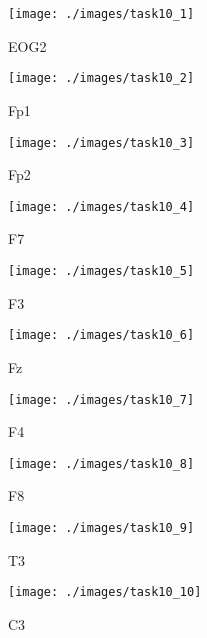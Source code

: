 \begin{figure}[!ht]
    \centering
    \texttt{[image: ./images/task10\_1]}
    \caption{EOG2}
    \label{fig:task10_eog2}
\end{figure}

\begin{figure}[!ht]
    \centering
    \texttt{[image: ./images/task10\_2]}
    \caption{Fp1}
    \label{fig:task10_fp1}
\end{figure}

\begin{figure}[!ht]
    \centering
    \texttt{[image: ./images/task10\_3]}
    \caption{Fp2}
    \label{fig:task10_fp2}
\end{figure}

\begin{figure}[!ht]
    \centering
    \texttt{[image: ./images/task10\_4]}
    \caption{F7}
    \label{fig:task10_f7}
\end{figure}

\begin{figure}[!ht]
    \centering
    \texttt{[image: ./images/task10\_5]}
    \caption{F3}
    \label{fig:task10_f3}
\end{figure}

\begin{figure}[!ht]
    \centering
    \texttt{[image: ./images/task10\_6]}
    \caption{Fz}
    \label{fig:task10_fz}
\end{figure}

\begin{figure}[!ht]
    \centering
    \texttt{[image: ./images/task10\_7]}
    \caption{F4}
    \label{fig:task10_f4}
\end{figure}

\begin{figure}[!ht]
    \centering
    \texttt{[image: ./images/task10\_8]}
    \caption{F8}
    \label{fig:task10_f8}
\end{figure}

\begin{figure}[!ht]
    \centering
    \texttt{[image: ./images/task10\_9]}
    \caption{T3}
    \label{fig:task10_t3}
\end{figure}

\begin{figure}[!ht]
    \centering
    \texttt{[image: ./images/task10\_10]}
    \caption{C3}
    \label{fig:task10_c3}
\end{figure}

